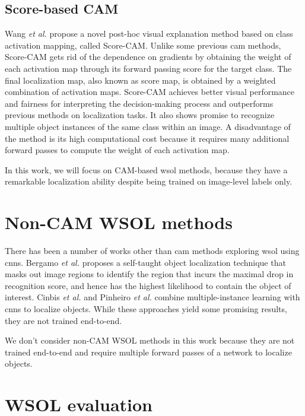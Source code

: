 \subsection{Score-based CAM}
Wang \textit{et al.} \cite{wang2020score} propose a novel post-hoc visual explanation method based on class activation mapping, called Score-CAM. Unlike some previous \acrshort{cam} methods, Score-CAM gets rid of the dependence on gradients by obtaining the weight of each activation map through its forward passing score for the target class. The final localization map, also known as score map, is obtained by a weighted combination of activation maps. Score-CAM achieves better visual performance and fairness for interpreting the decision-making process and outperforms previous methods on localization tasks. It also shows promise to recognize multiple object instances of the same class within an image. A disadvantage of the method is its high computational cost because it requires many additional forward passes to compute the weight of each activation map.

In this work, we will focus on CAM-based \acrshort{wsol} methods, because they have a remarkable localization ability despite being trained on image-level labels only.

\section{Non-CAM WSOL methods}
There has been a number of works other than \acrshort{cam} methods exploring \acrfull{wsol} using \acrshort{cnn}s. Bergamo \textit{et al.} \cite{bazzani2016self} proposes a self-taught object localization technique that masks out image regions to identify the region that incurs the maximal drop in recognition score, and hence has the highest likelihood to contain the object of interest. Cinbis \textit{et al.} \cite{cinbis2016weakly} and Pinheiro \textit{et al.} \cite{pinheiro2015image} combine multiple-instance learning with \acrshort{cnn}s to localize objects. While these approaches yield some promising results, they are not trained end-to-end.

We don't consider non-CAM WSOL methods in this work because they are not trained end-to-end and require multiple forward passes of a network to localize objects.

\section{WSOL evaluation}
